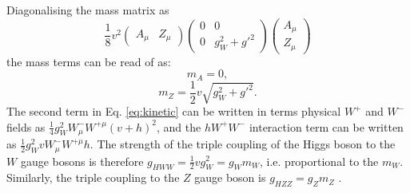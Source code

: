 Diagonalising the mass matrix as
\begin{equation}
\frac{1}{8} v^2
\begin{pmatrix}
A_\mu & Z_\mu
\end{pmatrix}
\begin{pmatrix}
0 & 0 \\
0 & g_W^2 + g'^2
\end{pmatrix}
\begin{pmatrix}
A_\mu \\
Z_\mu
\end{pmatrix}
\end{equation}
the mass terms can be read of as:
\begin{equation}
m_A = 0,
\end{equation}
\begin{equation}
m_Z = \frac{1}{2}v\sqrt{g_W^2 + g'^2}.
\end{equation}
The second term 
in Eq. \ref{eq:kinetic} can be written in terms physical $W^+$ and $W^-$ fields as
$\frac{1}{4} g_W^2 W_\mu^- W^{+\mu} (v+h)^2$,
and the $h W^+ W^-$ interaction term can be written as $\frac{1}{2} g_W^2 v W_\mu^- W^{+\mu} h$.
The strength of the triple coupling of the Higgs boson to the $W$ gauge bosons is therefore
$g_{HWW} = \frac{1}{2} v g_W^2 = g_W m_W$, i.e. proportional to the $m_W$. Similarly, the
triple coupling to the $Z$ gauge boson is $g_{HZZ} = g_Z m_Z$ \cite{Thomson:2013zua}.

